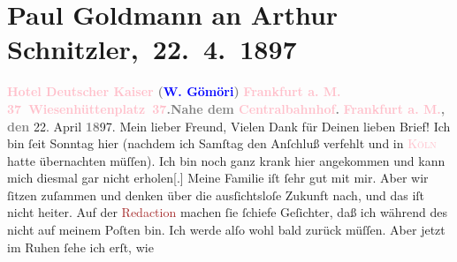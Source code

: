

               \section[ Paul Goldmann an Arthur Schnitzler, 22. 4. 1897]{Paul Goldmann an Arthur Schnitzler, 22. 4. 1897}\nopagebreak{}\rehead{ }\normalsize\beginnumbering{} \toendnotes[C]{\smallbreak\pagebreak[2]} 
\toendnotes[C]{\smallbreak}\pstart
           \noindent{}\centering{}{\pb}\textcolor{gray}{\textbf{\textcolor{pink}{Hotel Deutscher Kaiser}{}\ledrightnote{\textcolor{pink}{Hotel Deutscher Kaiser}}}}\pend
           \pstart
           \noindent{}\centering{}\textcolor{gray}{\textbf{(\textcolor{blue}{W. Gömöri}{}\ledrightnote{\textcolor{blue}{Wilhelm Gömöri}})}}\pend
           \pstart
           \noindent{}\centering{}\textcolor{gray}{\textbf{\textcolor{pink}{Frankfurt a. M.}{}\ledrightnote{\textcolor{pink}{Frankfurt am Main}}}}\pend
           \pstart
           \noindent{}\textcolor{gray}{\textbf{\textcolor{pink}{37 Wiesenhüttenplatz 37}{}\ledrightnote{\textcolor{pink}{Hotel Deutscher Kaiser}}.}}\hfill \textcolor{gray}{\textbf{Nahe dem \textcolor{pink}{Centralbahnhof}{}\ledrightnote{\textcolor{pink}{Frankfurt (Main) Hauptbahnhof}}.}}\pend
           \pstart
           \raggedleft{}\textcolor{gray}{\textbf{\textcolor{pink}{Frankfurt a. M.}{}\ledrightnote{\textcolor{pink}{Frankfurt am Main}}, den}}{ }22. April \textcolor{gray}{\textbf{18}}97.\pend
           \pstart{}Mein lieber Freund,\pend\pstart
           Vielen Dank für Deinen lieben Brief!\pend
           \pstart
           Ich bin ſeit Sonntag hier (nachdem ich Samſtag den Anſchluß verfehlt und in \textsc{\textcolor{pink}{Köln}{}\ledrightnote{\textcolor{pink}{Köln}}} hatte übernachten müſſen). Ich bin noch ganz krank hier angekommen und kann
               mich diesmal gar nicht erholen{[}.{]} Meine Familie iſt ſehr gut mit
               mir. Aber wir ſitzen zuſammen und denken über die ausſichtsloſe Zukunft nach, und das
               iſt nicht heiter. Auf der \textcolor{brown}{Redaction}{} machen ſie ſchiefe Geſichter, daß ich während des \label{K_L02809-1v}\label{K_L02809-1h} nicht auf meinem Poſten bin. Ich werde alſo wohl bald zurück {\pb}müſſen. Aber jetzt im Ruhen ſehe ich erſt, wie
